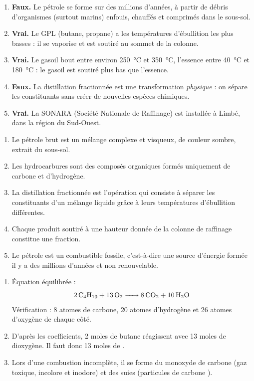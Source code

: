 \documentclass[11pt]{article}
\newcommand{\cle}[1]{{\popxbold\color{popdark}#1}}
\begin{document}
\begin{corrige}
\begin{enumerate}
\item \textbf{Faux.} Le pétrole se forme sur des millions d'années, à partir de débris d'organismes (surtout marins) enfouis, chauffés et comprimés dans le sous-sol.
\item \textbf{Vrai.} Le GPL (butane, propane) a les températures d'ébullition les plus basses : il se vaporise et est soutiré au sommet de la colonne.
\item \textbf{Vrai.} Le gasoil bout entre environ \SI{250}{\celsius} et \SI{350}{\celsius}, l'essence entre \SI{40}{\celsius} et \SI{180}{\celsius} : le gasoil est soutiré plus bas que l'essence.
\item \textbf{Faux.} La distillation fractionnée est une transformation \emph{physique} : on sépare les constituants sans créer de nouvelles espèces chimiques.
\item \textbf{Vrai.} La SONARA (Société Nationale de Raffinage) est installée à Limbé, dans la région du Sud-Ouest.
\end{enumerate}
\end{corrige}

\begin{corrige}
\begin{enumerate}
\item Le \cle{pétrole brut} est un mélange complexe et visqueux, de couleur sombre, extrait du sous-sol.
\item Les \cle{hydrocarbures} sont des composés organiques formés uniquement de carbone et d'hydrogène.
\item La \cle{distillation fractionnée} est l'opération qui consiste à séparer les constituants d'un mélange liquide grâce à leurs températures d'ébullition différentes.
\item Chaque produit soutiré à une hauteur donnée de la colonne de raffinage constitue une \cle{fraction}.
\item Le pétrole est un \cle{combustible fossile}, c'est-à-dire une source d'énergie formée il y a des millions d'années et non renouvelable.
\end{enumerate}
\end{corrige}

\begin{corrige}
\begin{enumerate}
\item Équation équilibrée :
\[ \ce{2C4H10 + 13O2 -> 8CO2 + 10H2O} \]
Vérification : 8 atomes de carbone, 20 atomes d'hydrogène et 26 atomes d'oxygène de chaque côté.
\item D'après les coefficients, 2 moles de butane réagissent avec 13 moles de dioxygène. Il faut donc \num{13} moles de .
\item Lors d'une combustion incomplète, il se forme du \cle{monoxyde de carbone}  (gaz toxique, incolore et inodore) et des \cle{suies} (particules de carbone ).
\end{enumerate}
\end{corrige}
\end{document}
